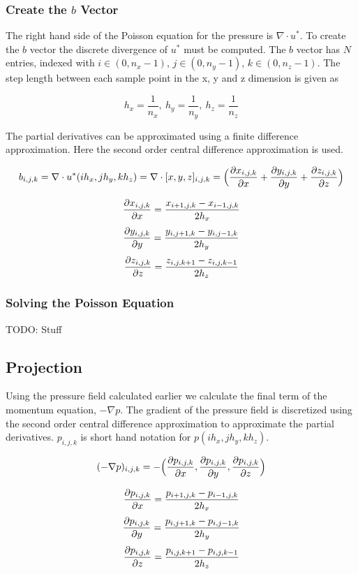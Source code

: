 \subsubsection{Create the $b$ Vector}

The right hand side of the Poisson equation for the pressure is $\nabla \cdot u^*$.
To create the $b$ vector the discrete divergence of $u^*$ must be computed. The 
$b$ vector has $N$ entries, indexed with $i \in (0, n_x-1)$, $j \in (0, n_y-1)$,
$k \in (0, n_z-1)$. The step length between each sample point in the x, y and z
dimension is given as 

$$ h_x = \frac{1}{n_x}, ~ h_y = \frac{1}{n_y}, ~ h_z = \frac{1}{n_z} $$

The partial derivatives can be approximated using a finite difference approximation. 
Here the second order central difference approximation is used.

$$ b_{i,j,k} = \nabla \cdot u^*(ih_x, jh_y, kh_z) = \nabla \cdot [x, y, z]_{i,j,k} = 
\Big( \frac{\partial x_{i,j,k}}{\partial x} + \frac{\partial y_{i,j,k}}{\partial y} + \frac{\partial z_{i,j,k}}{\partial z} \Big) $$

$$ \frac{\partial x_{i,j,k}}{\partial x} = \frac{x_{i+1,j,k} - x_{i-1,j,k}}{2h_x} $$
$$ \frac{\partial y_{i,j,k}}{\partial y} = \frac{y_{i,j+1,k} - y_{i,j-1,k}}{2h_y} $$
$$ \frac{\partial z_{i,j,k}}{\partial z} = \frac{z_{i,j,k+1} - z_{i,j,k-1}}{2h_z} $$

\subsubsection{Solving the Poisson Equation}

TODO: Stuff

\subsection{Projection}

Using the pressure field calculated earlier we calculate the final term of the 
momentum equation, $-\nabla p$. The gradient of the pressure field is discretized 
using the second order central difference approximation to approximate the 
partial derivatives. $p_{i,j,k}$ is short hand notation for $p(ih_x, jh_y, kh_z)$.

$$ (-\nabla p)_{i,j,k} = -\Big( \frac{\partial p_{i,j,k}}{\partial x}, \frac{\partial p_{i,j,k}}{\partial y}, \frac{\partial p_{i,j,k}}{\partial z} \Big) $$

$$ \frac{\partial p_{i,j,k}}{\partial x} = \frac{p_{i+1,j,k} - p_{i-1,j,k}}{2h_x} $$
$$ \frac{\partial p_{i,j,k}}{\partial y} = \frac{p_{i,j+1,k} - p_{i,j-1,k}}{2h_y} $$
$$ \frac{\partial p_{i,j,k}}{\partial z} = \frac{p_{i,j,k+1} - p_{i,j,k-1}}{2h_z} $$

